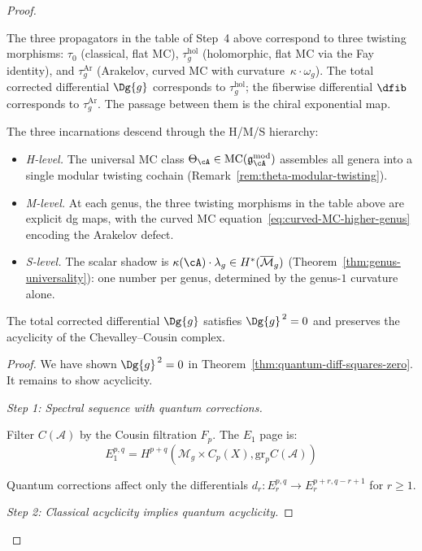 \begin{proof}
\begin{remark}
The three propagators in the table of Step~4 above correspond
to three twisting morphisms: $\tau_0$ (classical, flat MC),
$\tau_g^{\mathrm{hol}}$ (holomorphic, flat MC via the Fay
identity), and $\tau_g^{\mathrm{Ar}}$ (Arakelov, curved MC
with curvature~$\kappa \cdot \omega_g$).
The total corrected differential $\Dg{g}$ corresponds to
$\tau_g^{\mathrm{hol}}$; the fiberwise differential $\dfib$
corresponds to $\tau_g^{\mathrm{Ar}}$.
The passage between them is the chiral exponential map.

The three incarnations descend through the H/M/S hierarchy:
\begin{itemize}
\item \emph{H-level.}  The universal MC class
  $\Theta_\cA \in
  \mathrm{MC}(\mathfrak{g}_\cA^{\mathrm{mod}})$
  assembles all genera into a single modular twisting cochain
  (Remark~\ref{rem:theta-modular-twisting}).
\item \emph{M-level.}  At each genus, the three twisting
  morphisms in the table above are explicit dg maps,
  with the curved MC equation~\eqref{eq:curved-MC-higher-genus}
  encoding the Arakelov defect.
\item \emph{S-level.}  The scalar shadow is
  $\kappa(\cA) \cdot \lambda_g \in H^*(\overline{\mathcal{M}}_g)$
  (Theorem~\ref{thm:genus-universality}): one number per genus,
  determined by the genus-$1$ curvature alone.
\end{itemize}
\end{remark}

\begin{lemma}\label{lem:quantum-preserves-acyclicity}
The total corrected differential $\Dg{g}$ satisfies $\Dg{g}^{\,2} = 0$ and preserves the
acyclicity of the Chevalley--Cousin complex.
\end{lemma}

\begin{proof}
We have shown $\Dg{g}^{\,2} = 0$ in Theorem~\ref{thm:quantum-diff-squares-zero}. It remains to show acyclicity.

\emph{Step 1: Spectral sequence with quantum corrections.}

Filter $C(\mathcal{A})$ by the Cousin filtration $F_p$. The $E_1$ page is:
\[E_1^{p,q} = H^{p+q}(\mathcal{M}_g \times C_p(X), \text{gr}_p C(\mathcal{A}))\]

Quantum corrections affect only the differentials $d_r: E_r^{p,q} \to E_r^{p+r, q-r+1}$ for $r \geq 1$.

\emph{Step 2: Classical acyclicity implies quantum acyclicity.}


\end{proof}
\end{proof}
